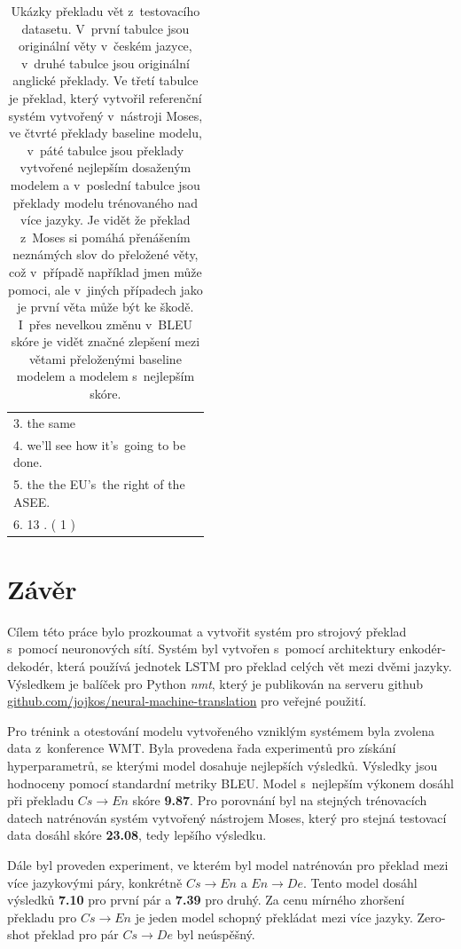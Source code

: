 \begin{table}[H]
\begin{center}
\begin{tabular}{p{0.44\linewidth}}
          3. the same \\
          4. we'll see how it's~going to be done. \\
          5. the the EU's~the right of the ASEE. \\
          6. 13 . ( 1 ) \\
          \bottomrule
        \end{tabular}
    \end{center}
	\caption{Ukázky překladu vět z~testovacího datasetu. V~první tabulce jsou originální věty v~českém jazyce, v~druhé tabulce jsou originální anglické překlady. Ve třetí tabulce je překlad, který vytvořil referenční systém vytvořený v~nástroji Moses, ve čtvrté překlady baseline modelu, v~páté tabulce jsou překlady vytvořené nejlepším dosaženým modelem a v~poslední tabulce jsou překlady modelu trénovaného nad více jazyky. Je vidět že překlad z~Moses si pomáhá přenášením neznámých slov do přeložené věty, což v~případě například jmen může pomoci, ale v~jiných případech jako je první věta může být ke škodě. I~přes nevelkou změnu v~BLEU skóre je vidět značné zlepšení mezi větami přeloženými baseline modelem a modelem s~nejlepším skóre.}
	\label{img:exampleResults}
\end{table}

\chapter{Závěr}
Cílem této práce bylo prozkoumat a vytvořit systém pro strojový překlad s~pomocí neuronových sítí. Systém byl vytvořen s~pomocí architektury enkodér-dekodér, která používá jednotek LSTM pro překlad celých vět mezi dvěmi jazyky. Výsledkem je balíček pro Python \emph{nmt}, který je publikován na serveru github \url{github.com/jojkos/neural-machine-translation} pro veřejné použití.

Pro trénink a otestování modelu vytvořeného vzniklým systémem byla zvolena data z~konference WMT. Byla provedena řada experimentů pro získání hyperparametrů, se kterými model dosahuje nejlepších výsledků. Výsledky jsou hodnoceny pomocí standardní metriky BLEU. Model s~nejlepším výkonem dosáhl při překladu $Cs\rightarrow En$ skóre \textbf{9.87}. Pro porovnání byl na stejných trénovacích datech natrénován systém vytvořený nástrojem Moses, který pro stejná testovací data dosáhl skóre \textbf{23.08}, tedy lepšího výsledku.

Dále byl proveden experiment, ve kterém byl model natrénován pro překlad mezi více jazykovými páry, konkrétně $Cs\rightarrow En$ a $En\rightarrow De$. Tento model dosáhl výsledků \textbf{7.10} pro první pár a \textbf{7.39} pro druhý. Za cenu mírného zhoršení překladu pro $Cs\rightarrow En$ je jeden model schopný překládat mezi více jazyky. Zero-shot překlad pro pár $Cs\rightarrow De$ byl neúspěšný.

